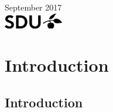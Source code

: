 \documentclass[a4paper]{report}
\theoremstyle{plain}
\begin{document}
\begin{titlepage}


{\large September 2017}\\[2cm] %


\includegraphics{SDU_logo.png}\\[.5cm] %
 

\vfill %

\end{titlepage}
%

%

\clearpage

\tableofcontents
\lstlistoflistings


\part{Introduction}
\clearpage
\chapter{Introduction}
    
    
\end{document}
